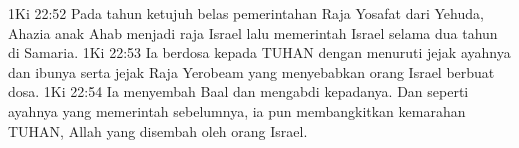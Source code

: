 1Ki 22:52  Pada tahun ketujuh belas pemerintahan Raja Yosafat dari Yehuda, Ahazia anak Ahab menjadi raja Israel lalu memerintah Israel selama dua tahun di Samaria.
1Ki 22:53  Ia berdosa kepada TUHAN dengan menuruti jejak ayahnya dan ibunya serta jejak Raja Yerobeam yang menyebabkan orang Israel berbuat dosa.
1Ki 22:54  Ia menyembah Baal dan mengabdi kepadanya. Dan seperti ayahnya yang memerintah sebelumnya, ia pun membangkitkan kemarahan TUHAN, Allah yang disembah oleh orang Israel.


